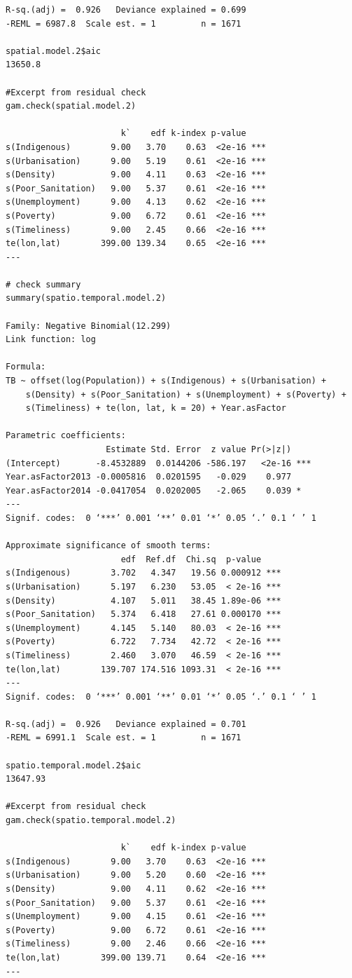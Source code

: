 \begin{verbatim}
R-sq.(adj) =  0.926   Deviance explained = 0.699
-REML = 6987.8  Scale est. = 1         n = 1671

spatial.model.2$aic
13650.8

#Excerpt from residual check
gam.check(spatial.model.2)

                       k`    edf k-index p-value    
s(Indigenous)        9.00   3.70    0.63  <2e-16 ***
s(Urbanisation)      9.00   5.19    0.61  <2e-16 ***
s(Density)           9.00   4.11    0.63  <2e-16 ***
s(Poor_Sanitation)   9.00   5.37    0.61  <2e-16 ***
s(Unemployment)      9.00   4.13    0.62  <2e-16 ***
s(Poverty)           9.00   6.72    0.61  <2e-16 ***
s(Timeliness)        9.00   2.45    0.66  <2e-16 ***
te(lon,lat)        399.00 139.34    0.65  <2e-16 ***
---

# check summary
summary(spatio.temporal.model.2)

Family: Negative Binomial(12.299) 
Link function: log 

Formula:
TB ~ offset(log(Population)) + s(Indigenous) + s(Urbanisation) + 
    s(Density) + s(Poor_Sanitation) + s(Unemployment) + s(Poverty) + 
    s(Timeliness) + te(lon, lat, k = 20) + Year.asFactor

Parametric coefficients:
                    Estimate Std. Error  z value Pr(>|z|)    
(Intercept)       -8.4532889  0.0144206 -586.197   <2e-16 ***
Year.asFactor2013 -0.0005816  0.0201595   -0.029    0.977    
Year.asFactor2014 -0.0417054  0.0202005   -2.065    0.039 *  
---
Signif. codes:  0 ‘***’ 0.001 ‘**’ 0.01 ‘*’ 0.05 ‘.’ 0.1 ‘ ’ 1

Approximate significance of smooth terms:
                       edf  Ref.df  Chi.sq  p-value    
s(Indigenous)        3.702   4.347   19.56 0.000912 ***
s(Urbanisation)      5.197   6.230   53.05  < 2e-16 ***
s(Density)           4.107   5.011   38.45 1.89e-06 ***
s(Poor_Sanitation)   5.374   6.418   27.61 0.000170 ***
s(Unemployment)      4.145   5.140   80.03  < 2e-16 ***
s(Poverty)           6.722   7.734   42.72  < 2e-16 ***
s(Timeliness)        2.460   3.070   46.59  < 2e-16 ***
te(lon,lat)        139.707 174.516 1093.31  < 2e-16 ***
---
Signif. codes:  0 ‘***’ 0.001 ‘**’ 0.01 ‘*’ 0.05 ‘.’ 0.1 ‘ ’ 1

R-sq.(adj) =  0.926   Deviance explained = 0.701
-REML = 6991.1  Scale est. = 1         n = 1671

spatio.temporal.model.2$aic
13647.93

#Excerpt from residual check
gam.check(spatio.temporal.model.2)

                       k`    edf k-index p-value    
s(Indigenous)        9.00   3.70    0.63  <2e-16 ***
s(Urbanisation)      9.00   5.20    0.60  <2e-16 ***
s(Density)           9.00   4.11    0.62  <2e-16 ***
s(Poor_Sanitation)   9.00   5.37    0.61  <2e-16 ***
s(Unemployment)      9.00   4.15    0.61  <2e-16 ***
s(Poverty)           9.00   6.72    0.61  <2e-16 ***
s(Timeliness)        9.00   2.46    0.66  <2e-16 ***
te(lon,lat)        399.00 139.71    0.64  <2e-16 ***
---
\end{verbatim}